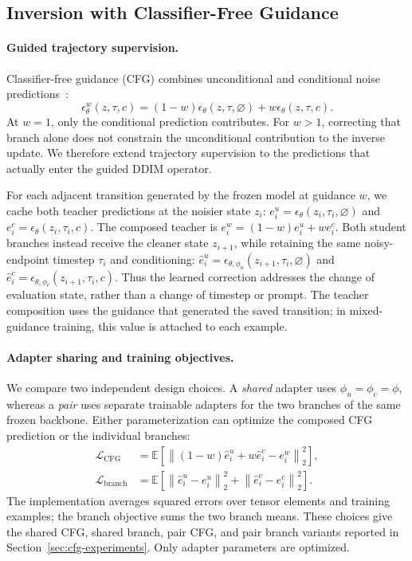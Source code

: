 \documentclass{article} %
\newcommand{\alek}[1]{{\color{purple}{alek: #1}}}
\begin{document}
\subsection{Inversion with Classifier-Free Guidance}
\alek{We need to keep consistent math notation across sections}
\label{sec:method-extensions}
\label{sec:guided-objective}

\paragraph{Guided trajectory supervision.}
Classifier-free guidance (CFG) combines unconditional and conditional noise
predictions~\citep{ho2021classifierfree}:
\begin{equation}
 \epsilon_\theta^w(z,\tau,c)
 =(1-w)\epsilon_\theta(z,\tau,\varnothing)
 +w\epsilon_\theta(z,\tau,c).
 \label{eq:guided-prediction}
\end{equation}
At $w=1$, only the conditional prediction contributes. For $w>1$, correcting
that branch alone does not constrain the unconditional contribution to the
inverse update. We therefore extend trajectory supervision to the predictions
that actually enter the guided DDIM operator.

For each adjacent transition generated by the frozen model at guidance $w$,
we cache both teacher predictions at the noisier state $z_i$:
$e_i^u=\epsilon_\theta(z_i,\tau_i,\varnothing)$ and
$e_i^c=\epsilon_\theta(z_i,\tau_i,c)$.
The composed teacher is $e_i^w=(1-w)e_i^u+w e_i^c$.
Both student branches instead receive the cleaner state $z_{i+1}$, while
retaining the same noisy-endpoint timestep $\tau_i$ and conditioning:
$\hat e_i^u=\epsilon_{\theta,\phi_u}(z_{i+1},\tau_i,\varnothing)$ and
$\hat e_i^c=\epsilon_{\theta,\phi_c}(z_{i+1},\tau_i,c)$.
\alek{Comment}
Thus the learned correction addresses the change of evaluation state, rather
than a change of timestep or prompt. The teacher composition uses the guidance
that generated the saved transition; in mixed-guidance training, this value
is attached to each example.

\paragraph{Adapter sharing and training objectives.}
We compare two independent design choices. A \emph{shared} adapter uses
$\phi_u=\phi_c=\phi$, whereas a \emph{pair} uses separate trainable adapters
for the two branches of the same frozen backbone. Either parameterization can
optimize the composed CFG prediction or the individual branches:
\begin{align}
 \mathcal{L}_{\mathrm{CFG}}
 &=\mathbb{E}\!\left[
 \left\|(1-w)\hat e_i^u+w\hat e_i^c-e_i^w\right\|_2^2\right],
 \label{eq:cfg-composed-loss}\\
 \mathcal{L}_{\mathrm{branch}}
 &=\mathbb{E}\!\left[
 \left\|\hat e_i^u-e_i^u\right\|_2^2
 +\left\|\hat e_i^c-e_i^c\right\|_2^2\right].
 \label{eq:cfg-branch-loss}
\end{align}
The implementation averages squared errors over tensor elements and training
examples; the branch objective sums the two branch means. These choices give
the shared CFG, shared branch, pair CFG, and pair branch variants reported in
Section~\ref{sec:cfg-experiments}. Only adapter parameters are optimized.
\end{document}
